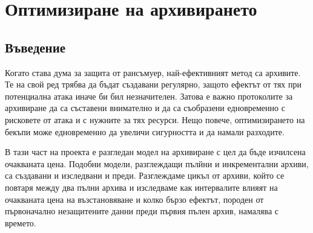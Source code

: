 \documentclass[11pt, a4paper]{article}
\theoremstyle{definition}
\begin{document}
	\section{Оптимизиране на архивирането}
		\subsection{Въведение}
			Когато става дума за защита от рансъмуер, най-ефективният метод са архивите. Те на свой ред трябва да бъдат създавани регулярно, защото ефектът от тях при потенциална атака иначе би бил незначителен. Затова е важно протоколите за архивиране да са съставени внимателно и да са съобразени едновременно с рисковете от атака и с нужните за тях ресурси. Нещо повече, оптимизирането на бекъпи може едновременно да увеличи сигурността и да намали разходите.\par
			В тази част на проекта е разгледан модел на архивиране с цел да бъде изчилсена очакваната цена. Подобни модели, разглеждащи пълйни и инкрементални архиви, са създавани и изследвани и преди\cite{nakamura2003optimal}\cite{qian2010optimal}. Разглеждаме цикъл от архиви, който се повтаря между два пълни архива и изследваме как интервалите влияят на очакваната цена на възстановяване и колко бързо ефектът, породен от първоначално незащитените данни преди първия пълен архив, намалява с времето.
\end{document}

